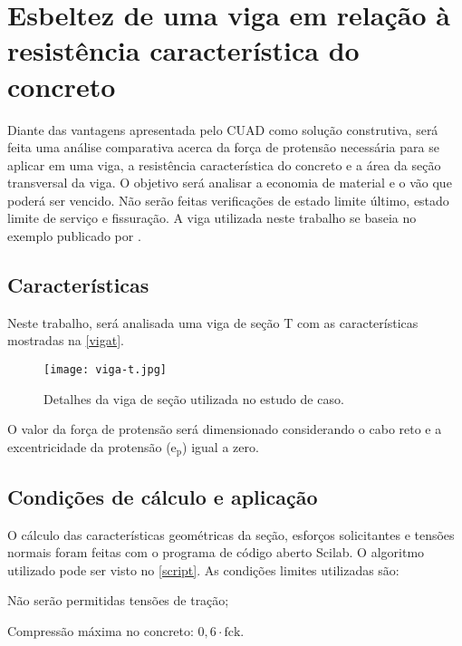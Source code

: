 \chapter{Esbeltez de uma viga em relação à resistência característica do concreto}

Diante das vantagens apresentada pelo CUAD como solução construtiva, será feita uma análise comparativa acerca da força de protensão necessária para se aplicar em uma viga, a resistência característica do concreto e a área da seção transversal da viga. O objetivo será analisar a economia de material e o vão que poderá ser vencido. Não serão feitas verificações de estado limite último, estado limite de serviço e fissuração. A viga utilizada neste trabalho se baseia no exemplo publicado por .


\section{Características}

Neste trabalho, será analisada uma viga de seção T com as características mostradas na \autoref{vigat}.

\begin{figure}[htb]
	\caption{\label{vigat} Detalhes da viga de seção  utilizada no estudo de caso.}
		\begin{center}
			\texttt{[image: viga-t.jpg]}
		\end{center}
\end{figure}


O valor da força de protensão será dimensionado considerando o cabo reto e a excentricidade da protensão ($ \text{e}_{\text{p}} $) igual a zero.

\section{Condições de cálculo e aplicação}

O cálculo das características geométricas da seção, esforços solicitantes e tensões normais foram feitas com o programa de código aberto Scilab. O algoritmo utilizado pode ser visto no \autoref{script}. As condições limites utilizadas são:

\begin{alineas}
	\item Não serão permitidas tensões de tração;
	\item Compressão máxima no concreto: $ 0,6 \cdot \text{fck} $.
\end{alineas}

